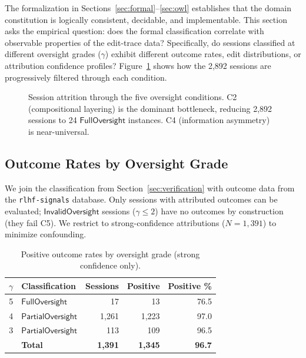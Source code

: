 \documentclass[11pt]{article}
\begin{document}
The formalization in Sections~\ref{sec:formal}--\ref{sec:owl} establishes that the domain constitution is logically consistent, decidable, and implementable.
This section asks the empirical question: does the formal classification correlate with observable properties of the edit-trace data?
Specifically, do sessions classified at different oversight grades ($\gamma$) exhibit different outcome rates, edit distributions, or attribution confidence profiles?
Figure~\ref{fig:funnel} shows how the 2{,}892 sessions are progressively filtered through each condition.

\begin{figure}[t]
\centering

\caption{Session attrition through the five oversight conditions. C2 (compositional layering) is the dominant bottleneck, reducing 2{,}892 sessions to 24 $\mathsf{FullOversight}$ instances. C4 (information asymmetry) is near-universal.}
\label{fig:funnel}
\end{figure}

\subsection{Outcome Rates by Oversight Grade}
\label{sec:outcome-by-grade}

We join the classification from Section~\ref{sec:verification} with outcome data from the \texttt{rlhf-signals} database.
Only sessions with attributed outcomes can be evaluated; $\mathsf{InvalidOversight}$ sessions ($\gamma \leq 2$) have no outcomes by construction (they fail C5).
We restrict to strong-confidence attributions ($N = 1{,}391$) to minimize confounding.

\begin{table}[ht]
\centering
\caption{Positive outcome rates by oversight grade (strong confidence only).}
\label{tab:outcome-by-grade}
\begin{tabular}{@{}clrrr@{}}
\toprule
$\gamma$ & \textbf{Classification} & \textbf{Sessions} & \textbf{Positive} & \textbf{Positive \%} \\
\midrule
5 & $\mathsf{FullOversight}$    & 17    & 13    & 76.5 \\
4 & $\mathsf{PartialOversight}$ & 1{,}261 & 1{,}223 & 97.0 \\
3 & $\mathsf{PartialOversight}$ & 113   & 109   & 96.5 \\
\midrule
  & \textbf{Total}              & \textbf{1{,}391} & \textbf{1{,}345} & \textbf{96.7} \\
\bottomrule
\end{tabular}
\end{table}
\end{document}
